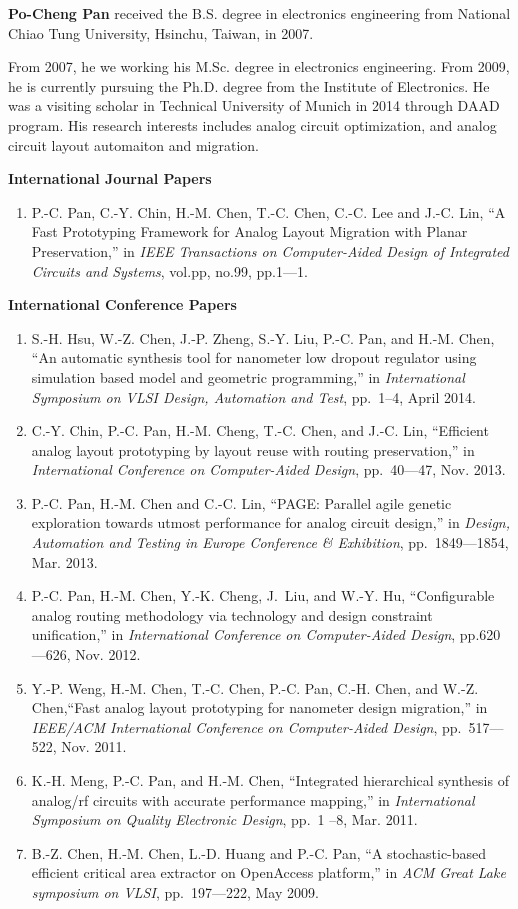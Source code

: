 
{\bf Po-Cheng Pan} received the B.S. degree in electronics engineering from National Chiao Tung University, Hsinchu, Taiwan, in 2007. 

From 2007, he we working his M.Sc. degree in electronics engineering. From 2009, he is currently pursuing the Ph.D. degree from the Institute of Electronics. He was a visiting scholar in Technical University of Munich in 2014 through DAAD program. His research interests includes analog circuit optimization, and analog circuit layout automaiton and migration. 

{\bf International Journal Papers}
\begin{enumerate}
  \item P.-C. Pan, C.-Y. Chin, H.-M. Chen, T.-C. Chen, C.-C. Lee and J.-C. Lin, ``A Fast Prototyping Framework for Analog Layout Migration with Planar Preservation,'' in \emph{IEEE Transactions on Computer-Aided Design of Integrated Circuits and Systems}, vol.pp, no.99, pp.1---1. 
\end{enumerate}
{\bf International Conference Papers}
\begin{enumerate}
  \item S.-H. Hsu, W.-Z. Chen, J.-P. Zheng, S.-Y. Liu, P.-C. Pan, and H.-M. Chen, ``An automatic synthesis tool for nanometer low dropout regulator using simulation based model and geometric programming,'' in \emph{International Symposium on VLSI Design, Automation and Test}, pp.~1--4, April 2014.
  \item C.-Y. Chin, P.-C. Pan, H.-M. Cheng, T.-C. Chen, and J.-C. Lin, ``Efficient analog layout prototyping by layout reuse with routing preservation,'' in \emph{International Conference on Computer-Aided Design}, pp.~40---47, Nov. 2013.
  \item P.-C. Pan, H.-M. Chen and C.-C. Lin, ``PAGE: Parallel agile genetic exploration towards utmost performance for analog circuit design,'' in \emph{Design, Automation and Testing in Europe Conference \& Exhibition}, pp.~1849---1854, Mar. 2013.
  \item P.-C. Pan, H.-M. Chen, Y.-K. Cheng, J.~Liu, and W.-Y. Hu, ``Configurable analog routing methodology via technology and design constraint unification,'' in \emph{International Conference on Computer-Aided Design}, pp.620---626, Nov. 2012.
  \item Y.-P. Weng, H.-M. Chen, T.-C. Chen, P.-C. Pan, C.-H. Chen, and W.-Z. Chen,``Fast analog layout prototyping for nanometer design migration,'' in {\em{IEEE/ACM} International Conference on Computer-Aided Design}, pp.~517---522, Nov. 2011.
  \item K.-H. Meng, P.-C. Pan, and H.-M. Chen, ``Integrated hierarchical synthesis of analog/rf circuits with accurate performance mapping,'' in {\em International Symposium on Quality Electronic Design}, pp.~1 --8, Mar. 2011.
  \item B.-Z. Chen, H.-M. Chen, L.-D. Huang and P.-C. Pan, ``A stochastic-based efficient critical area extractor on OpenAccess platform,'' in \emph{ACM Great Lake symposium on VLSI}, pp.~197---222, May 2009.
\end{enumerate}
